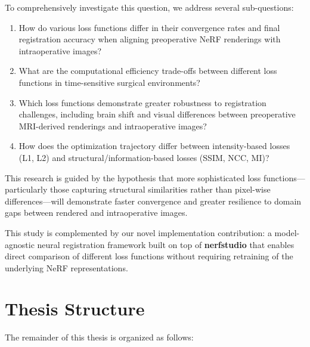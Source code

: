 To comprehensively investigate this question, we address several sub-questions:

\begin{enumerate}
    \item How do various loss functions differ in their convergence rates and final registration accuracy when aligning preoperative NeRF renderings with intraoperative images?
    
    \item What are the computational efficiency trade-offs between different loss functions in time-sensitive surgical environments?
    
    \item Which loss functions demonstrate greater robustness to registration challenges, including brain shift and visual differences between preoperative MRI-derived renderings and intraoperative images?
    
    \item How does the optimization trajectory differ between intensity-based losses (L1, L2) and structural/information-based losses (SSIM, NCC, MI)?
\end{enumerate}

This research is guided by the hypothesis that more sophisticated loss functions—particularly those capturing structural similarities rather than pixel-wise differences—will demonstrate faster convergence and greater resilience to domain gaps between rendered and intraoperative images. 

This study is complemented by our novel implementation contribution: a model-agnostic neural registration framework built on top of \textbf{nerfstudio} \parencite{Tancik_2023} that enables direct comparison of different loss functions without requiring retraining of the underlying NeRF representations.

\section{Thesis Structure}\label{section:thesis-structure}

The remainder of this thesis is organized as follows:


